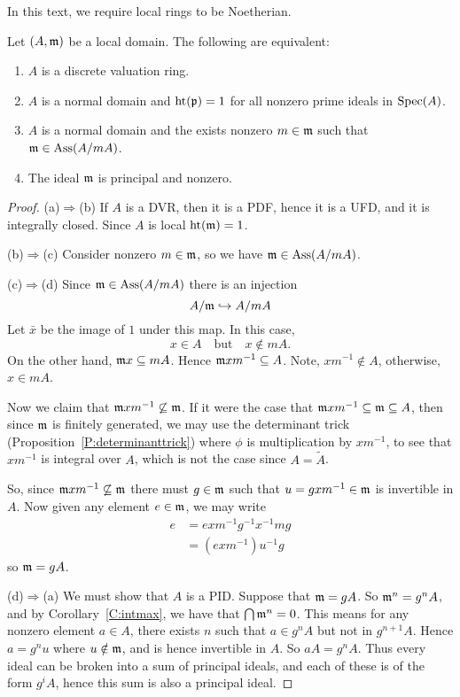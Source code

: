 \documentclass{ximera}
\begin{document}
In this text, we require local rings to be Noetherian.


\begin{proposition}
  Let $(A,\mathfrak{m})$ be a local domain. The following are equivalent:
  \begin{enumerate}
  \item $A$ is a discrete valuation ring.
  \item $A$ is a normal domain and $\operatorname{ht}(\mathfrak{p})= 1$ for all nonzero prime
    ideals in $\operatorname{Spec}(A)$.
  \item $A$ is a normal domain and the exists nonzero $m\in \mathfrak{m}$ such
    that $\mathfrak{m}\in\operatorname{Ass}(A/m A)$.
  \item The ideal $\mathfrak{m}$ is principal and nonzero.
  \end{enumerate}
  \begin{proof}
    (a)$\Rightarrow$(b) If $A$ is a DVR, then it is a PDF, hence it is
    a UFD, and it is integrally closed.  Since $A$ is local $\operatorname{ht}(\mathfrak{m}) =
    1$.

    (b)$\Rightarrow$(c) Consider nonzero $m\in \mathfrak{m}$, so we have
    $\mathfrak{m}\in\operatorname{Ass}(A/m A)$.

    (c)$\Rightarrow$(d) Since $\mathfrak{m}\in\operatorname{Ass}(A/m A)$ there is an injection
    \[
    A/\mathfrak{m} \hookrightarrow A/m A
    \]
    Let $\bar{x}$ be the image of $1$ under this map. In this case,
    \[
    x\in A \quad\text{but}\quad x\notin m A.
    \]
    On the other hand, $\mathfrak{m} x \subseteq m A$. Hence $\mathfrak{m} x m^{-1} \subseteq
    A$. Note, $xm^{-1}\notin A$, otherwise, $x\in mA$.

    Now we claim that $\mathfrak{m} xm^{-1}\not\subseteq\mathfrak{m}$. If it were the case
    that $\mathfrak{m} xm^{-1}\subseteq \mathfrak{m}\subseteq A$, then since $\mathfrak{m}$ is finitely
    generated, we may use the determinant trick
    (Proposition~\ref{P:determinanttrick}) where $\phi$ is
    multiplication by $xm^{-1}$, to see that $xm^{-1}$ is integral
    over $A$, which is not the case since $A = \tilde{A}$.

    So, since $\mathfrak{m} xm^{-1} \not\subseteq\mathfrak{m}$ there must $g\in \mathfrak{m}$ such
    that $u = gxm^{-1}\in\mathfrak{m}$ is invertible in $A$.  Now given any
    element $e\in\mathfrak{m}$, we may write
    \begin{align*}
      e &= e xm^{-1} g^{-1} x^{-1} m g \\
      &= (exm^{-1}) u^{-1} g
    \end{align*}
    so $\mathfrak{m} = g A$.

    (d)$\Rightarrow$(a) We must show that $A$ is a PID. Suppose that
    $\mathfrak{m} = gA$. So $\mathfrak{m}^n = g^n A$, and by Corollary~\ref{C:intmax}, we
    have that $\bigcap \mathfrak{m}^n = 0$. This means for any nonzero element
    $a\in A$, there exists $n$ such that $a\in g^n A$ but not in
    $g^{n+1}A$. Hence $a = g^nu$ where $u\notin\mathfrak{m}$, and is hence
    invertible in $A$. So $a A = g^n A$. Thus every ideal can be
    broken into a sum of principal ideals, and each of these is of
    the form $g^i A$, hence this sum is also a principal ideal.
  \end{proof}
\end{proposition}
\end{document}
